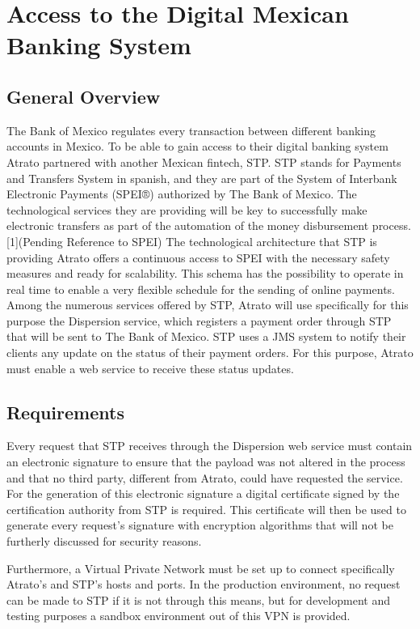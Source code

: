 \chapter{Access to the Digital Mexican Banking System}

\section{General Overview}

The Bank of Mexico regulates every transaction between different banking accounts in Mexico. To be able to gain access to their digital banking system Atrato partnered with another Mexican fintech, STP. STP stands for Payments and Transfers System in spanish, and they are part of the System of Interbank Electronic Payments (SPEI®) authorized by The Bank of Mexico. The technological services they are providing will be key to successfully make electronic transfers as part of the automation of the money disbursement process. [1](Pending Reference to SPEI)
The technological architecture that STP is providing Atrato offers a continuous access to SPEI with the necessary safety measures and ready for scalability. This schema has the possibility to operate in real time to enable a very flexible schedule for the sending of online payments.
Among the numerous services offered by STP, Atrato will use specifically for this purpose the Dispersion service, which registers a payment order through STP that will be sent to The Bank of Mexico.
STP uses a JMS system to notify their clients any update on the status of their payment orders. For this purpose, Atrato must enable a web service to receive these status updates.

\section{Requirements}

Every request that STP receives through the Dispersion web service must contain an electronic signature to ensure that the payload was not altered in the process and that no third party, different from Atrato, could have requested the service.
For the generation of this electronic signature a digital certificate signed by the certification authority from STP is required. This certificate will then be used to generate every request’s signature with encryption algorithms that will not be furtherly discussed for security reasons. 

Furthermore, a Virtual Private Network must be set up to connect specifically Atrato’s and STP’s hosts and ports. In the production environment, no request can be made to STP if it is not through this means, but for development and testing purposes a sandbox environment out of this VPN is provided.

